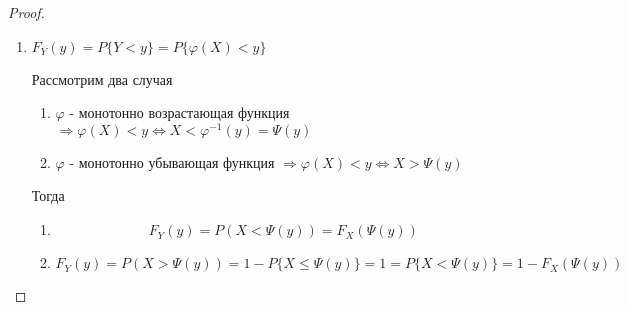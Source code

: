 \documentclass[a4paper, 14pt]{report}
\begin{document}
\begin{proof}
    \begin{enumerate}
        \item $F_Y(y) = P\{Y<y\} = P\{\varphi(X) < y\}$

            Рассмотрим два случая

            \begin{enumerate}
                \item $\varphi$ - монотонно возрастающая функция $\Rightarrow \varphi(X) < y \Leftrightarrow X < \varphi^{-1}(y) = \Psi(y)$
                \item $\varphi$ - монотонно убывающая функция $\Rightarrow \varphi(X) < y \Leftrightarrow X > \Psi(y)$
            \end{enumerate}

            Тогда 

            \begin{enumerate}
                \item

                    $$
                    F_Y(y) = P(X<\Psi(y)) = F_X(\Psi(y))
                    $$

                \item

                    $$
                    F_Y(y) = P(X>\Psi(y)) = 1 - P\{X \le \Psi(y)\} = 1 = P\{X < \Psi(y)\} = 1 - F_X(\Psi(y))
                    $$
            \end{enumerate}
    \end{enumerate}
\end{proof}
\end{document}
